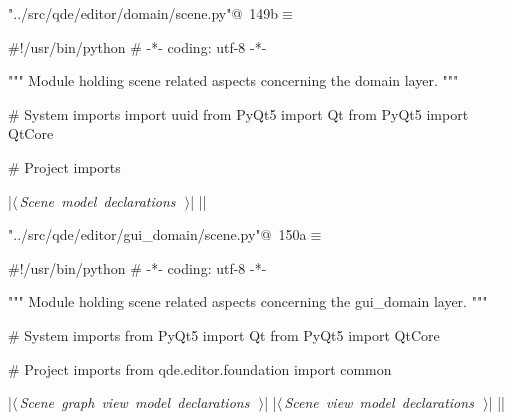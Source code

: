 \documentclass[%
    a4paper,    %
    justified,  %
    nobib,      %
    openany     %
]{tufte-book}
\begin{document}
\begin{flushleft} \small
\begin{minipage}{\linewidth}\label{scrap169}\raggedright\small
{} \verb@"../src/qde/editor/domain/scene.py"@\nobreak\ {\footnotesize {149b}}$\equiv$
\vspace{-1ex}
\begin{pythoncode}
#!/usr/bin/python
# -*- coding: utf-8 -*-

""" Module holding scene related aspects concerning the domain layer. """

# System imports
import uuid
from PyQt5 import Qt
from PyQt5 import QtCore

# Project imports


|\hbox{$\langle\,${\itshape Scene model declarations}\nobreak\ {\footnotesize {}}$\,\rangle$}|
|\NWsep|
\end{pythoncode}
\vspace{1.5ex}
\footnotesize
\begin{list}{}{\setlength{\itemsep}{-\parsep}\setlength{\itemindent}{-\leftmargin}}

\item{}
\end{list}
\end{minipage}\vspace{4ex}
\end{flushleft}
\begin{flushleft} \small
\begin{minipage}{\linewidth}\label{scrap170}\raggedright\small
{} \verb@"../src/qde/editor/gui_domain/scene.py"@\nobreak\ {\footnotesize {150a}}$\equiv$
\vspace{-1ex}
\begin{pythoncode}

#!/usr/bin/python
# -*- coding: utf-8 -*-

""" Module holding scene related aspects concerning the gui_domain layer. """

# System imports
from PyQt5 import Qt
from PyQt5 import QtCore

# Project imports
from qde.editor.foundation import common

|\hbox{$\langle\,${\itshape Scene graph view model declarations}\nobreak\ {\footnotesize {}}$\,\rangle$}|
|\hbox{$\langle\,${\itshape Scene view model declarations}\nobreak\ {\footnotesize {}}$\,\rangle$}|
|\NWsep|
\end{pythoncode}
\vspace{1.5ex}
\footnotesize
\begin{list}{}{\setlength{\itemsep}{-\parsep}\setlength{\itemindent}{-\leftmargin}}

\item{}
\end{list}
\end{minipage}\vspace{4ex}
\end{flushleft}
\end{document}
